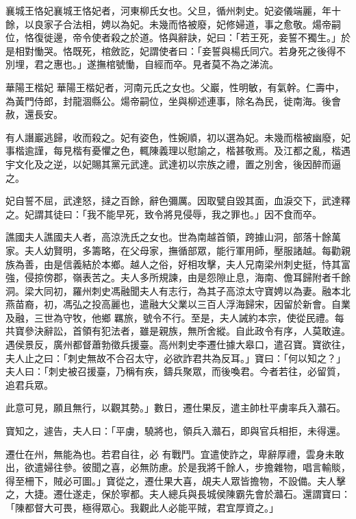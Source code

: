 \begin{pinyinscope}
 襄城王恪妃襄城王恪妃者，河東柳氏女也。父旦，循州刺史。妃姿儀端麗，年十餘，以良家子合法相，娉以為妃。未幾而恪被廢，妃修婦道，事之愈敬。煬帝嗣位，恪復徙邊，帝令使者殺之於道。恪與辭訣，妃曰：「若王死，妾誓不獨生。」於是相對慟哭。恪既死，棺斂訖，妃謂使者曰：「妾誓與楊氏同穴。若身死之後得不別埋，君之惠也。」遂撫棺號慟，自經而卒。見者莫不為之涕流。



 華陽王楷妃
 華陽王楷妃者，河南元氏之女也。父巖，性明敏，有氣幹。仁壽中，為黃門侍郎，封龍涸縣公。煬帝嗣位，坐與柳述連事，除名為民，徙南海。後會赦，還長安。



 有人譖巖逃歸，收而殺之。妃有姿色，性婉順，初以選為妃。未幾而楷被幽廢，妃事楷逾謹，每見楷有憂懼之色，輒陳義理以慰諭之，楷甚敬焉。及江都之亂，楷遇宇文化及之逆，以妃賜其黨元武達。武達初以宗族之禮，置之別舍，後因醉而逼之。



 妃自誓不屈，武達怒，撻之百餘，辭色彌厲。因取甓自毀其面，血淚交下，武達釋之。妃謂其徒曰：「我不能早死，致令將見侵辱，我之罪也。」因不食而卒。



 譙國夫人譙國夫人者，高涼洗氏之女也。世為南越首領，跨據山洞，部落十餘萬家。夫人幼賢明，多籌略，在父母家，撫循部眾，能行軍用師，壓服諸越。每勸親族為善，由是信義結於本鄉。越人之俗，好相攻擊，夫人兄南梁州刺史挺，恃其富強，侵掠傍郡，嶺表苦之。夫人多所規諫，由是怨隙止息，海南、儋耳歸附者千餘洞。梁大同初，羅州刺史馮融聞夫人有志行，為其子高涼太守寶娉以為妻。融本北燕苗裔，初，馮弘之投高麗也，遣融大父業以三百人浮海歸宋，因留於新會。自業及融，三世為守牧，他鄉
 羈旅，號令不行。至是，夫人誡約本宗，使從民禮。每共寶參決辭訟，首領有犯法者，雖是親族，無所舍縱。自此政令有序，人莫敢違。遇侯景反，廣州都督蕭勃徵兵援臺。高州刺史李遷仕據大皋口，遣召寶。寶欲往，夫人止之曰：「刺史無故不合召太守，必欲詐君共為反耳。」寶曰：「何以知之？」夫人曰：「刺史被召援臺，乃稱有疾，鑄兵聚眾，而後喚君。今者若往，必留質，追君兵眾。



 此意可見，願且無行，以觀其勢。」數日，遷仕果反，遣主帥杜平虜率兵入灨石。



 寶知之，遽告，夫人曰：「平虜，驍將也，領兵入灨石，即與官兵相拒，未得還。



 遷仕在州，無能為也。若君自往，必
 有戰鬥。宜遣使詐之，卑辭厚禮，雲身未敢出，欲遣婦往參。彼聞之喜，必無防慮。於是我將千餘人，步擔雜物，唱言輸賧，得至柵下，賊必可圖。」寶從之，遷仕果大喜，覘夫人眾皆擔物，不設備。夫人擊之，大捷。遷仕遂走，保於寧都。夫人總兵與長城侯陳霸先會於灨石。還謂寶曰：「陳都督大可畏，極得眾心。我觀此人必能平賊，君宜厚資之。」




\end{pinyinscope}
